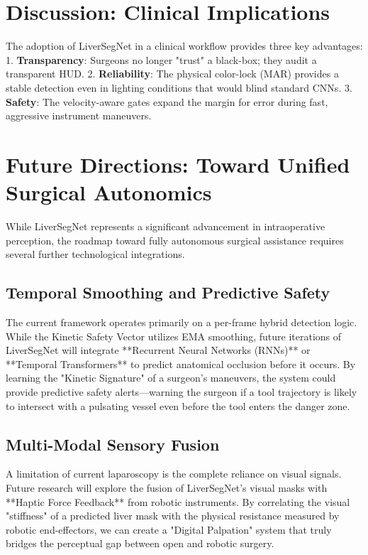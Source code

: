 \documentclass[conference]{IEEEtran}
\begin{document}
\section{Discussion: Clinical Implications}
The adoption of LiverSegNet in a clinical workflow provides three key advantages:
1. \textbf{Transparency}: Surgeons no longer "trust" a black-box; they audit a transparent HUD.
2. \textbf{Reliability}: The physical color-lock (MAR) provides a stable detection even in lighting conditions that would blind standard CNNs.
3. \textbf{Safety}: The velocity-aware gates expand the margin for error during fast, aggressive instrument maneuvers.

\section{Future Directions: Toward Unified Surgical Autonomics}
While LiverSegNet represents a significant advancement in intraoperative perception, the roadmap toward fully autonomous surgical assistance requires several further technological integrations. 

\subsection{Temporal Smoothing and Predictive Safety}
The current framework operates primarily on a per-frame hybrid detection logic. While the Kinetic Safety Vector utilizes EMA smoothing, future iterations of LiverSegNet will integrate **Recurrent Neural Networks (RNNs)** or **Temporal Transformers** to predict anatomical occlusion before it occurs. By learning the "Kinetic Signature" of a surgeon's maneuvers, the system could provide predictive safety alerts—warning the surgeon if a tool trajectory is likely to intersect with a pulsating vessel even before the tool enters the danger zone.

\subsection{Multi-Modal Sensory Fusion}
A limitation of current laparoscopy is the complete reliance on visual signals. Future research will explore the fusion of LiverSegNet's visual masks with **Haptic Force Feedback** from robotic instruments. By correlating the visual "stiffness" of a predicted liver mask with the physical resistance measured by robotic end-effectors, we can create a "Digital Palpation" system that truly bridges the perceptual gap between open and robotic surgery.
\end{document}
